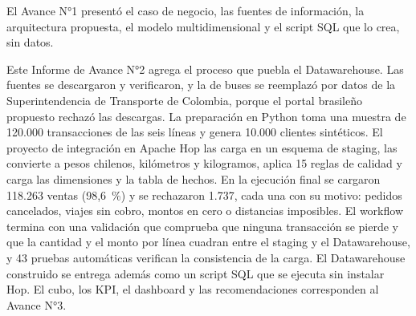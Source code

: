El Avance N°1 presentó el caso de negocio, las fuentes de información, la
arquitectura propuesta, el modelo multidimensional y el script SQL que lo
crea, sin datos.

Este Informe de Avance N°2 agrega el proceso que puebla el Datawarehouse. Las
fuentes se descargaron y verificaron, y la de buses se reemplazó por datos de
la Superintendencia de Transporte de Colombia, porque el portal brasileño
propuesto rechazó las descargas. La preparación en Python toma una muestra de
120.000 transacciones de las seis líneas y genera 10.000 clientes sintéticos.
El proyecto de integración en Apache Hop las carga en un esquema de staging,
las convierte a pesos chilenos, kilómetros y kilogramos, aplica 15 reglas de
calidad y carga las dimensiones y la tabla de hechos. En la ejecución final se
cargaron 118.263 ventas (98,6~\%) y se rechazaron 1.737, cada una con su
motivo: pedidos cancelados, viajes sin cobro, montos en cero o distancias
imposibles. El workflow termina con una validación que comprueba que ninguna
transacción se pierde y que la cantidad y el monto por línea cuadran entre el
staging y el Datawarehouse, y 43 pruebas automáticas verifican la consistencia
de la carga. El Datawarehouse construido se entrega además como un script SQL
que se ejecuta sin instalar Hop. El cubo, los KPI, el dashboard y las
recomendaciones corresponden al Avance N°3.
